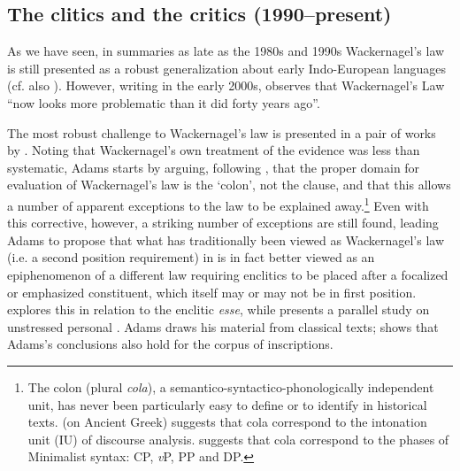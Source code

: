 
\subsection{The clitics and the critics (1990--present)}
As we have seen, in summaries as late as the 1980s and 1990s Wackernagel's law is still presented as a robust generalization about early Indo-European languages (cf. also \citealp{Collinge1985}). However, writing in the early 2000s, \citet[168]{Clackson2007} observes that Wackernagel's Law ``now looks more problematic than it did forty years ago''.

The most robust challenge to Wackernagel's law is presented in a pair of works by \citet{Adams1994book,Adams1994pronouns}. Noting that Wackernagel's own treatment of the  evidence was less than systematic, Adams starts by arguing, following \citet{Fraenkel1932,Fraenkel1933,Fraenkel1965}, that the proper domain for evaluation of Wackernagel's law is the `colon', not the clause, and that this allows a number of apparent exceptions to the law to be explained away.\footnote{The colon (plural \textit{cola}), a semantico-syntactico-phonologically independent unit, has never been particularly easy to define or to identify in historical texts. \citet{Scheppers2011} (on Ancient Greek) suggests that cola correspond to the intonation unit (IU) of discourse analysis. \citet[259--262]{Ledgeway2012} suggests that cola correspond to the phases of Minimalist syntax: CP, \textit{v}P, PP and DP.} Even with this corrective, however, a striking number of exceptions are still found, leading Adams to propose that what has traditionally been viewed as Wackernagel's law (i.e. a second position requirement) in  is in fact better viewed as an epiphenomenon of a different law requiring enclitics to be placed after a focalized or emphasized constituent, which itself may or may not be in first position. \citet{Adams1994book} explores this in relation to the  enclitic  \textit{esse}, while \citet{Adams1994pronouns} presents a parallel study on unstressed personal . Adams draws his material from classical   texts; \citet{Kruschwitz2004} shows that Adams's conclusions also hold for the corpus of  inscriptions.

